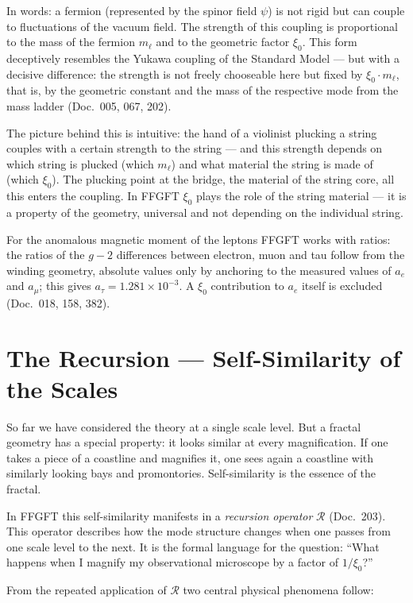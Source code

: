 \medskip\noindent
In words: a fermion (represented by the spinor field $\psi$) is not
rigid but can couple to fluctuations of the vacuum field. The
strength of this coupling is proportional to the mass of the
fermion $m_\ell$ and to the geometric factor $\xi_0$. This form
deceptively resembles the Yukawa coupling of the Standard Model ---
but with a decisive difference: the strength is not freely
chooseable here but fixed by $\xi_0 \cdot m_\ell$, that is, by the
geometric constant and the mass of the respective mode from the mass
ladder (Doc.~005, 067, 202).

The picture behind this is intuitive: the hand of a violinist
plucking a string couples with a certain strength to the string ---
and this strength depends on which string is plucked (which
$m_\ell$) and what material the string is made of (which $\xi_0$).
The plucking point at the bridge, the material of the string core,
all this enters the coupling. In FFGFT $\xi_0$ plays the role of
the string material --- it is a property of the geometry, universal
and not depending on the individual string.

For the anomalous magnetic moment of the leptons FFGFT works with
ratios: the ratios of the $g-2$ differences between electron, muon
and tau follow from the winding geometry, absolute values only by
anchoring to the measured values of $a_e$ and $a_\mu$; this gives
$a_\tau = 1.281\times10^{-3}$. A $\xi_0$ contribution to $a_e$ itself
is excluded (Doc.~018, 158, 382).

\section{The Recursion --- Self-Similarity of the Scales}

So far we have considered the theory at a single scale level. But a
fractal geometry has a special property: it looks similar at every
magnification. If one takes a piece of a coastline and magnifies it,
one sees again a coastline with similarly looking bays and
promontories. Self-similarity is the essence of the fractal.

In FFGFT this self-similarity manifests in a \emph{recursion
operator} $\mathcal{R}$ (Doc.~203). This operator describes how the
mode structure changes when one passes from one scale level to the
next. It is the formal language for the question: \enquote{What
happens when I magnify my observational microscope by a factor of
$1/\xi_0$?}

From the repeated application of $\mathcal{R}$ two central physical
phenomena follow:

